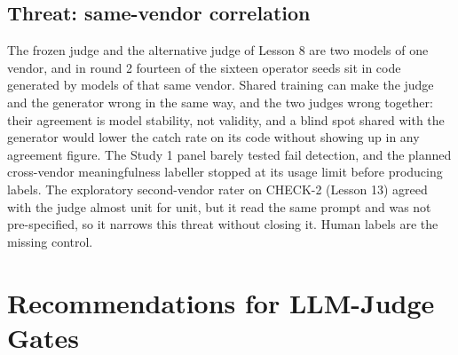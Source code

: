\documentclass[10pt,a4paper]{article}
\begin{document}
\subsection{Threat: same-vendor correlation}\label{sec:samevendor}

The frozen judge and the alternative judge of Lesson 8 are two models of one vendor, and in round 2 fourteen of the
sixteen operator seeds sit in code generated by models of that same vendor. Shared training can make the judge and
the generator wrong in the same way, and the two judges wrong together: their agreement is model stability, not
validity, and a blind spot shared with the generator would lower the catch rate on its code without showing up in
any agreement figure. The Study 1 panel barely tested fail detection, and the planned cross-vendor meaningfulness
labeller stopped at its usage limit before producing labels. The exploratory second-vendor rater on CHECK-2
(Lesson 13) agreed with the judge almost unit for unit, but it read the same prompt and was not pre-specified, so it
narrows this threat without closing it. Human labels are the missing control. %
\section{Recommendations for LLM-Judge Gates}\label{sec:recs}
\end{document}
